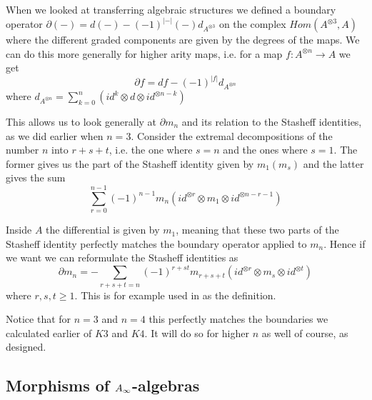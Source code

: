 When we looked at transferring algebraic structures we defined a boundary operator $\partial (-) = d(-)-(-1)^{|-|}(-)d_{A^{\otimes 3}}$ on the complex $Hom(A^{\otimes 3}, A)$ where the different graded components are given by the degrees of the maps. We can do this more generally for higher arity maps, i.e. for a map $f\colon A^{\otimes n}\longrightarrow A$ we get
\begin{equation*}
    \partial f = df -(-1)^{|f|}d_{A^{\otimes n}}
\end{equation*}
where $d_{A^{\otimes n}}= \sum_{k=0}^{n}(id^{k}\otimes d\otimes id^{\otimes n-k})$

This allows us to look generally at $\partial m_n$ and its relation to the Stasheff identities, as we did earlier when $n=3$. Consider the extremal decompositions of the number $n$ into $r+s+t$, i.e. the one where $s=n$ and the ones where $s=1$. The former gives us the part of the Stasheff identity given by $m_1(m_s)$ and the latter gives the sum 
\begin{equation*}
    \sum_{r=0}^{n-1} (-1)^{n-1}m_n(id^{\otimes r}\otimes m_1\otimes id^{\otimes n-r-1})
\end{equation*}

Inside $A$ the differential is given by $m_1$, meaning that these two parts of the Stasheff identity perfectly matches the boundary operator applied to $m_n$. Hence if we want we can reformulate the Stasheff identities as
\begin{equation*}
    \partial m_n = - \sum_{r+s+t=n}(-1)^{r+st}m_{r+s+t}(id^{\otimes r}\otimes m_s\otimes id^{\otimes t})
\end{equation*}
where $r,s,t\geq 1$. This is for example used in \cite{AHO} as the definition. 

Notice that for $n=3$ and $n=4$ this perfectly matches the boundaries we calculated earlier of $K3$ and $K4$. It will do so for higher $n$ as well of course, as designed. 


\subsection{Morphisms of \texorpdfstring{$A_{\infty}$}{A}-algebras}


